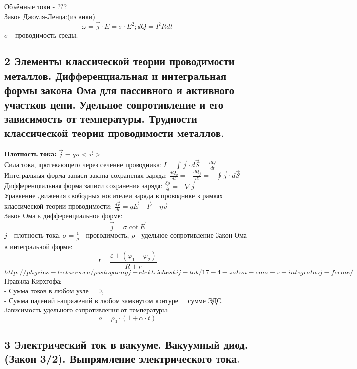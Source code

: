 \documentclass[a4paper,12pt]{article}
\begin{document}
Объёмные токи - ???\\
Закон Джоуля-Ленца:(из вики)\\
\begin{equation}
	\omega = \vec{j} \cdot E = \sigma \cdot E^2; dQ = I^2Rdt
\end{equation}
$\sigma$ - проводимость среды.


\subsection{2	Элементы классической теории проводимости металлов. Дифференциальная и интегральная формы закона Ома для пассивного и активного участков цепи. Удельное сопротивление и его зависимость от температуры. Трудности классической теории проводимости металлов.}
\textbf{Плотность тока:} $\vec{j} = qn<\vec{v}>$\\
Сила тока, протекающего через сечение проводника: $I = \int \vec{j} \cdot d\vec{S} = \frac{dQ}{dt}$\\
Интегральная форма записи закона сохранения заряда: $\frac{dQ_v}{dt} = - \frac{dQ_j}{dt} = - \oint \vec{j} \cdot d\vec{S}$\\
Дифференциальная форма записи сохранения заряда: $\frac{\delta \rho}{\delta t} = - \nabla \vec{j}$\\
Уравнение движения свободных носителей заряда в проводнике в рамках классической теории проводимости: $\frac{d \vec{v}}{dt} = q \vec{E} + \vec{F} - \eta \vec{v}$\\
Закон Ома в дифференциальной форме:\\
\begin{equation}
	\vec{j} = \sigma \cot  \vec{E}
\end{equation}
$j$ - плотность тока, $\sigma = \frac{1}{\rho}$ - проводимость, $\rho$ - удельное сопротивление
Закон Ома в интегральной форме:\\
\begin{equation}
	I = \frac{\varepsilon + (\varphi _1 - \varphi _2)}{R + r}
\end{equation}
$http://physics-lectures.ru/postoyannyj-elektricheskij-tok/17-4-zakon-oma-v-integralnoj-forme/$
Правила Кирхгофа:\\
- Сумма токов в любом узле = 0;\\
- Сумма падений напряжений в любом замкнутом контуре = сумме ЭДС.\\
Зависимость удельного сопротивления от температуры:\\
\begin{equation}
	\rho = \rho _0 \cdot (1 + \alpha \cdot t)
\end{equation}


\subsection{3	Электрический ток в вакууме. Вакуумный диод. (Закон 3/2). Выпрямление электрического тока.}
\end{document}
